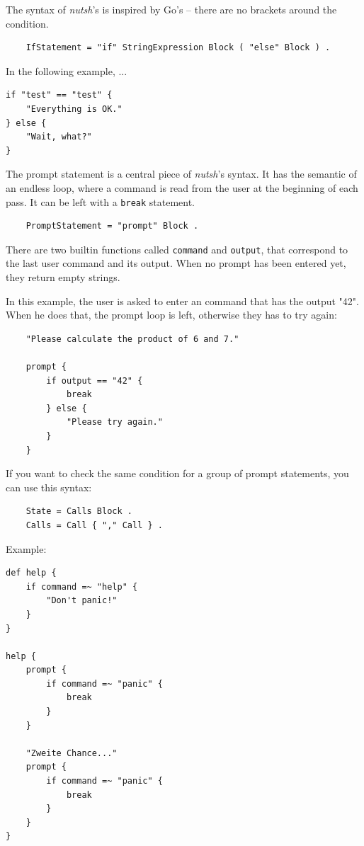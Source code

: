 \documentclass[paper=a4,abstract=on,cleardoublepage=empty,numbers=noenddot,toc=bib]{scrreprt}
\begin{document}
The syntax of \emph{nutsh}'s is inspired by Go's -- there are no brackets around the condition.

\begin{lstlisting}
    IfStatement = "if" StringExpression Block ( "else" Block ) .
\end{lstlisting}

In the following example, ...

\begin{lstlisting}
if "test" == "test" {
    "Everything is OK."
} else {
    "Wait, what?"
}
\end{lstlisting}


The prompt statement is a central piece of \emph{nutsh}'s syntax. It has the semantic of an endless loop, where a command is read from the user at the beginning of each pass. It can be left with a \texttt{break} statement.

\begin{lstlisting}
    PromptStatement = "prompt" Block .
\end{lstlisting}

There are two builtin functions called \texttt{command} and \texttt{output}, that correspond to the last user command and its output. When no prompt has been entered yet, they return empty strings.

In this example, the user is asked to enter an command that has the output "42". When he does that, the prompt loop is left, otherwise they has to try again:

\begin{lstlisting}
    "Please calculate the product of 6 and 7."

    prompt {
        if output == "42" {
            break
        } else {
            "Please try again."
        }
    }
\end{lstlisting}


If you want to check the same condition for a group of prompt statements, you can use this syntax:

\begin{lstlisting}
    State = Calls Block .
    Calls = Call { "," Call } .
\end{lstlisting}

Example:

\begin{lstlisting}
def help {
    if command =~ "help" {
        "Don't panic!"
    }
}

help {
    prompt {
        if command =~ "panic" {
            break
        }
    }

    "Zweite Chance..."
    prompt {
        if command =~ "panic" {
            break
        }
    }
}
\end{lstlisting}
\end{document}
